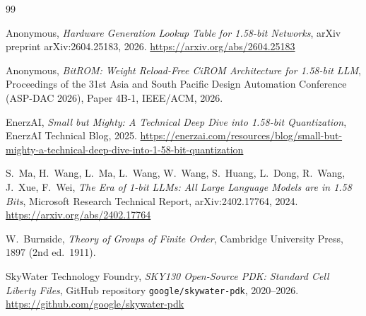 \begin{thebibliography}{99}

Anonymous,
\emph{Hardware Generation Lookup Table for 1.58-bit Networks},
arXiv preprint arXiv:2604.25183, 2026.
\url{https://arxiv.org/abs/2604.25183}

Anonymous,
\emph{BitROM: Weight Reload-Free CiROM Architecture for 1.58-bit LLM},
Proceedings of the 31st Asia and South Pacific Design Automation
Conference (ASP-DAC 2026), Paper 4B-1, IEEE/ACM, 2026.

EnerzAI,
\emph{Small but Mighty: A Technical Deep Dive into 1.58-bit Quantization},
EnerzAI Technical Blog, 2025.
\url{https://enerzai.com/resources/blog/small-but-mighty-a-technical-deep-dive-into-1-58-bit-quantization}

S.~Ma, H.~Wang, L.~Ma, L.~Wang, W.~Wang, S.~Huang, L.~Dong, R.~Wang,
J.~Xue, F.~Wei,
\emph{The Era of 1-bit LLMs: All Large Language Models are in 1.58 Bits},
Microsoft Research Technical Report, arXiv:2402.17764, 2024.
\url{https://arxiv.org/abs/2402.17764}

W.~Burnside,
\emph{Theory of Groups of Finite Order},
Cambridge University Press, 1897 (2nd ed.\ 1911).

SkyWater Technology Foundry,
\emph{SKY130 Open-Source PDK: Standard Cell Liberty Files},
GitHub repository \texttt{google/skywater-pdk}, 2020--2026.
\url{https://github.com/google/skywater-pdk}

\end{thebibliography}

